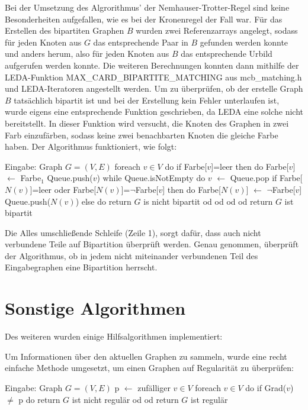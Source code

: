 Bei der Umsetzung des Algrorithmus' der Nemhauser-Trotter-Regel sind keine Besonderheiten aufgefallen, wie es bei der Kronenregel der Fall war. Für das Erstellen des bipartiten Graphen $B$ wurden zwei Referenzarrays angelegt, sodass für jeden Knoten aus $G$ das entsprechende Paar in $B$ gefunden werden konnte und anders herum, also für jeden Knoten aus $B$ das entsprechende Urbild aufgerufen werden konnte. Die weiteren Berechnungen konnten dann mithilfe der LEDA-Funktion MAX\_CARD\_BIPARTITE\_MATCHING aus mcb\_matching.h und LEDA-Iteratoren angestellt werden. Um zu überprüfen, ob der erstelle Graph $B$ tatsächlich bipartit ist und bei der Erstellung kein Fehler unterlaufen ist, wurde eigens eine entsprechende Funktion geschrieben, da LEDA eine solche nicht bereitstellt. In dieser Funktion wird versucht, die Knoten des Graphen in zwei Farb einzufärben, sodass keine zwei benachbarten Knoten die gleiche Farbe haben. Der Algorithmus funktioniert, wie folgt:
\begin{singlespace}
\begin{algorithm}[caption={Bipartit-Check}, label={alg4}]
Eingabe: Graph $G=(V,E)$ 
foreach $ v \in V$ do
  if Farbe[$v$]=leer then do
    Farbe[$v$] $\leftarrow$ Farbe$_{1}$    
    Queue.push($v$)
    while Queue.isNotEmpty do
      $v$ $\leftarrow$ Queue.pop
      if Farbe[$N(v)$]=leer oder Farbe[$N(v)$]=$\neg$Farbe[$v$] then do
        Farbe[$N(v)$] $\leftarrow$ $\neg$Farbe[$v$]
        Queue.push($N(v)$)
      else do
        return $G$ is nicht bipartit
      od 
    od
  od  
od
return $G$ ist bipartit
\end{algorithm}
\end{singlespace}
Die Alles umschließende Schleife (Zeile 1), sorgt dafür, dass auch nicht verbundene Teile auf Bipartition überprüft werden. Genau genommen, überprüft der Algorithmus, ob in jedem nicht miteinander verbundenen Teil des Eingabegraphen eine Bipartition herrscht.

\section{Sonstige Algorithmen}
\label{ch:Implementierung:sec:Algo}
Des weiteren wurden einige Hilfsalgorithmen implementiert:


Um Informationen über den aktuellen Graphen zu sammeln, wurde eine recht einfache Methode umgesetzt, um einen Graphen auf Regularität zu überprüfen:
\begin{singlespace}
\begin{algorithm}[caption={Regulär-Check}, label={alg5}]
Eingabe: Graph $G=(V,E)$ 
p $\leftarrow$ zufälliger $v \in V$
foreach $v \in V$ do
  if Grad($v$) $\neq$ p do 
    return $G$ ist nicht regulär
  od
od
return $G$ ist regulär
\end{algorithm}
\end{singlespace}

\begin{singlespace}
\begin{algorithm}[caption={Regulär-Check}, label={alg4}]
\end{algorithm}
\end{singlespace}

